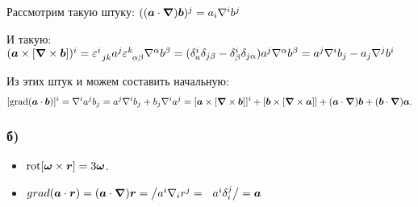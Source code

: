 \begin{itemize}
	Рассмотрим такую штуку: $((\mbox{\boldmath $a$} \cdot \mbox{\boldmath $\nabla$}) \mbox{\boldmath $b$})^j
	=
	a_i \nabla^i b^j
	$

	И такую: $
	(\mbox{\boldmath $a$} \times [\mbox{\boldmath $\nabla$} \times \mbox{\boldmath $b$}])^i
	=
	\varepsilon_{\phantom{0} j k}^{i} a^j \varepsilon_{\phantom{0} \alpha \beta}^{k} \nabla^\alpha b^\beta
	=
	(\delta_a^i \delta_{j \beta} - \delta_\beta^i \delta_{j \alpha}) a^j \nabla^\alpha b^\beta
	=
	a^j \nabla^i b_j - a_j \nabla^j b^i
	$

	Из этих штук и можем составить начальную:
	 $$[\mathop{\mathrm{grad}}\nolimits(\mbox{\boldmath $a$} \cdot \mbox{\boldmath $b$})]^i = \nabla^i a^j b_j = a^j \nabla^i b_j + b_j \nabla^i a^j
	 =
	 [\mbox{\boldmath $a$} \times [\mbox{\boldmath $\nabla$} \times \mbox{\boldmath $b$}]]^i + [\mbox{\boldmath $b$} \times [\mbox{\boldmath $\nabla$} \times \mbox{\boldmath $a$}]] + (\mbox{\boldmath $a$} \cdot \mbox{\boldmath $\nabla$}) \mbox{\boldmath $b$} + (\mbox{\boldmath $b$} \cdot \mbox{\boldmath $\nabla$}) \mbox{\boldmath $a$}.
	 $$
\end{itemize}

\subsubsection*{б)}
\begin{itemize}
	\item $\mathop{\mathrm{rot}}\nolimits [\mbox{\boldmath $\omega$} \times \mbox{\boldmath $r$}] = 3 \mbox{\boldmath $\omega$}$.

	\item 
	$ grad(\vc{a} \cdot \vc{r}) = (\vc{a} \cdot \vc{\nabla}) \vc{r} = \big/ a^i \nabla_i r^j =\phantom{\frac{1}{1}} a^i \delta_i^j \big/ = \vc{a}$
\end{itemize}


